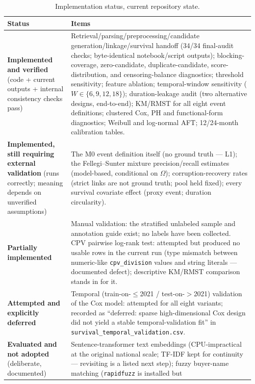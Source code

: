\documentclass[11pt]{article}
\begin{document}
\begin{table}[h!]
\centering
\caption{Implementation status, current repository state.}
\label{tab:status}
\footnotesize
\begin{tabular}{p{}p{}}
\toprule
Status & Items \\
\midrule
\textbf{Implemented and verified} (code + current outputs + internal
consistency checks pass) &
Retrieval/parsing/preprocessing/candidate generation/linkage/survival
handoff (34/34 final-audit checks; byte-identical notebook/script outputs);
blocking-coverage, zero-candidate, duplicate-candidate, score-distribution,
and censoring-balance diagnostics; threshold sensitivity; feature ablation;
temporal-window sensitivity ($W\in\{6,9,12,18\}$); duration-leakage audit
(two alternative designs, end-to-end); KM/RMST for all eight event
definitions; clustered Cox, PH and functional-form diagnostics; Weibull and
log-normal AFT; 12/24-month calibration tables. \\
\addlinespace
\textbf{Implemented, still requiring external validation} (runs correctly;
meaning depends on unverified assumptions) &
The M0 event definition itself (no ground truth --- L1); the
Fellegi--Sunter mixture precision/recall estimates (model-based,
conditional on $\Omega$); corruption-recovery rates (strict links are not
ground truth; pool held fixed); every survival covariate effect (proxy
event; duration circularity). \\
\addlinespace
\textbf{Partially implemented} &
Manual validation: the stratified unlabeled sample and annotation guide
exist; no labels have been collected. CPV pairwise log-rank test: attempted
but produced no usable rows in the current run (type mismatch between
numeric-like \texttt{cpv\_division} values and string literals ---
documented defect); descriptive KM/RMST comparison stands in for it. \\
\addlinespace
\textbf{Attempted and explicitly deferred} &
Temporal (train-on-$\leq$2021 / test-on-$>$2021) validation of the Cox
model: attempted for all eight variants; recorded as ``deferred: sparse
high-dimensional Cox design did not yield a stable temporal-validation
fit'' in \texttt{survival\_temporal\_validation.csv}. \\
\addlinespace
\textbf{Evaluated and not adopted} (deliberate, documented) &
Sentence-transformer text embeddings (CPU-impractical at the original
national scale; TF-IDF kept for continuity --- revisiting is a listed next
step); fuzzy buyer-name matching (\texttt{rapidfuzz} is installed but

\end{tabular}
\end{table}
\end{document}
